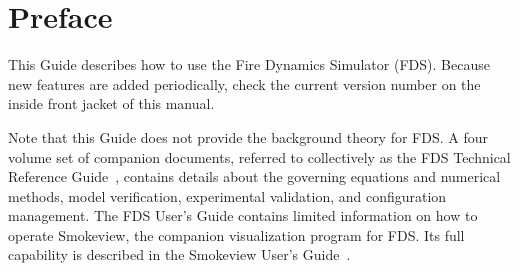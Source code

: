 \documentclass[11pt]{book}
\begin{document}
\begin{minipage}[t][9in][s]{6.25in}


\vspace{3in}

\large
{}

\vfill

\hspace{1in}

\end{minipage}

\clearpage

\frontmatter

\pagestyle{plain}




\chapter{Preface}

This Guide describes how to use the Fire Dynamics Simulator (FDS). Because new features are added periodically, check
the current version number on the inside front jacket of this manual.

Note that this Guide does not provide the background theory for FDS. A four volume set of companion documents, referred to
collectively as the FDS Technical Reference Guide~\cite{FDS_Math_Guide}, contains details about the governing
equations and numerical methods, model verification, experimental validation, and configuration management.
The FDS User's Guide contains limited information on how to operate Smokeview, the companion
visualization program for FDS. Its full capability is described in the Smokeview User's Guide~\cite{Smokeview_Users_Guide}.
\end{document}
